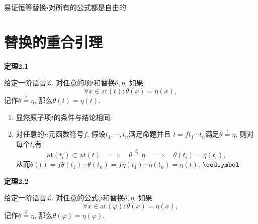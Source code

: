 \documentclass[UTF8]{ctexart}
\begin{document}
\vspace{10pt}

易证恒等替换$i$对所有的公式都是自由的.





\newpage

\section{替换的重合引理}

\hypertarget{sec:定理2.1}{}
\noindent\textbf{定理2.1}

给定一阶语言$\mathcal{L}$. 对任意的项$t$和替换$\theta,\eta$, 如果
\[
    \forall x\in\mathrm{at}(t):\theta(x)=\eta(x),
\]
记作$\theta\overset{\displaystyle t}{=}\eta$, 那么$\theta(t)=\eta(t)$.


\begin{enumerate}
    \item 显然原子项$t$的条件与结论相同.
    \item 对任意的$n$元函数符号$f$, 假设$t_1,\cdots,t_n$满足命题并且
    $t=ft_1\cdots t_n$满足$\theta\overset{\displaystyle t}{=}\eta$,
    则对每个$t_i$有
    \[
        \mathrm{at}(t_i)\subset\mathrm{at}(t)\quad\implies\quad
        \theta\overset{\displaystyle t_i}{=}\eta\quad\implies\quad
        \theta(t_i)=\eta(t_i),
    \]
    从而$\theta(t)=f\theta(t_1)\cdots\theta(t_n)=f\eta(t_1)\cdots\eta(t_n)=\eta(t)$.
    \hfill $\qedsymbol$
\end{enumerate}

\vspace{10pt}

\hypertarget{sec:定理2.2}{}
\noindent\textbf{定理2.2}

给定一阶语言$\mathcal{L}$. 对任意的公式$\varphi$和替换$\theta,\eta$, 如果
\[
    \forall x\in\mathrm{at}(\varphi):\theta(x)=\eta(x),
\]
记作$\theta\overset{\displaystyle\varphi}{=}\eta$,
那么$\theta(\varphi)=\eta(\varphi)$.

\end{document}
